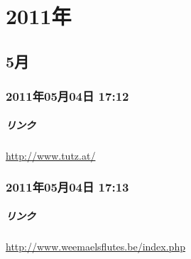 \chapter{2011年}

\section{5月}

\subsection*{2011年05月04日 17:12}

\paragraph{リンク}
\url{http://www.tutz.at/}

\subsection*{2011年05月04日 17:13}

\paragraph{リンク}
\url{http://www.weemaelsflutes.be/index.php}


